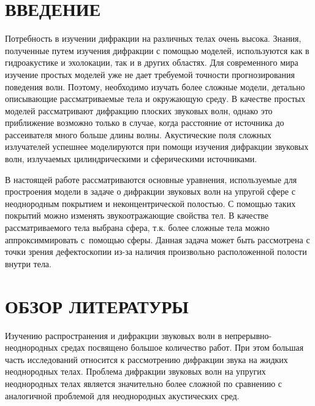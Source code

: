 

\renewcommand{\bibname}{СПИСОК ИСПОЛЬЗОВАННЫХ ИСТОЧНИКОВ}
\renewcommand\refname{СПИСОК ИСПОЛЬЗОВАННЫХ ИСТОЧНИКОВ}

%

\setcounter{page}{2}
\thispagestyle {empty}
\renewcommand{\contentsname}{\centering СОДЕРЖАНИЕ}
\tableofcontents


\newpage
\section*{ВВЕДЕНИЕ}
Потребность в изучении дифракции на различных телах очень высока. Знания, полученные путем изучения дифракции с помощью моделей, используются как в гидроакустике и эхолокации, так и в других областях. Для современного мира изучение простых моделей уже не дает требуемой точности прогнозирования поведения волн. Поэтому, необходимо изучать более сложные модели, детально описывающие рассматриваемые тела и окружающую среду.
В качестве простых моделей рассматривают дифракцию плоских звуковых волн, однако это приближение возможно только в случае, когда расстояние от источника до рассеивателя много больше длины волны. Акустические поля сложных излучателей успешнее моделируются при помощи изучения дифракции звуковых волн, излучаемых цилиндрическими и сферическими источниками.

В настоящей работе рассматриваются основные уравнения, используемые для простроения модели в задаче о дифракции звуковых волн на упругой сфере с неоднородным покрытием и неконцентрической полостью. С помощью таких покрытий можно изменять звукоотражающие свойства тел. В качестве рассматриваемого тела выбрана сфера, т.к. более сложные тела можно аппроксиммировать с~помощью сферы. Данная задача может быть рассмотрена с точки зрения дефектоскопии из-за наличия произвольно расположенной полости внутри тела.


\newpage
\section{ОБЗОР ЛИТЕРАТУРЫ}
Изучению  распространения и дифракции звуковых волн в непрерывно-не\-од\-но\-род\-ных средах посвящено большое количество работ. При этом большая часть исследований относится к рассмотрению дифракции звука на жидких неоднородных телах. Проблема дифракции звуковых волн на упругих неоднородных телах является значительно более сложной по сравнению с аналогичной проблемой для неоднородных акустических сред.

